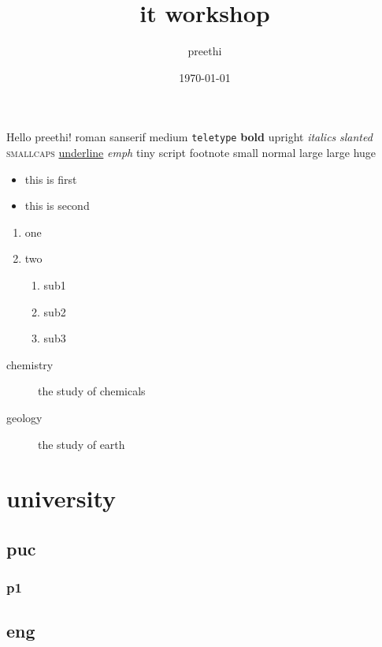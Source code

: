 \documentclass{article}
\title{it workshop}
\date{\today}
\author{preethi}
\begin{document}
\maketitle
{}
Hello preethi!
\textrm{roman}
\textsf{sanserif}
\textmd{medium}
\texttt{teletype}
\textbf{bold}
\textup{upright}
\textit{italics}
\textsl{slanted}
\textsc{smallcaps}
\underline{underline}
\emph{emph}
\tiny{tiny}
\scriptsize{script}
\footnotesize{footnote}
\small{small}
\normalsize{normal}
\large{large}
\LARGE{large}
\huge{huge}
\begin{itemize}
\item this is first
\item this is second
\end{itemize}
\begin{enumerate}
\item one
\item two
\begin{enumerate}[label=(\Roman*)]
\item sub1
\item sub2
\setcounter{enumii}{7}
\item sub3
\end{enumerate}
\end{enumerate}
\begin{description}
\item[chemistry]the study of chemicals
\item[geology]the study of earth
\end{description}
\tableofcontents
\section{university}
\subsection{puc}
\subsubsection{p1}
\subsection{eng}
\end{document}
